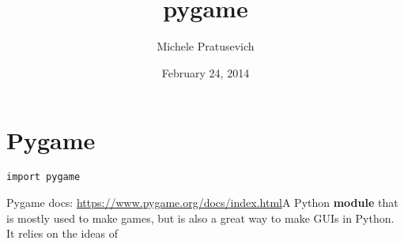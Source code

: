 \documentclass[letterpaper,10pt,english]{/usr/local/lib/python2.7/dist-packages/sphinx/texinputs/sphinxhowto}
\title{pygame}
\date{February 24, 2014}
\author{Michele Pratusevich}
\begin{document}
        
            \maketitle
        

        


        
        \section{Pygame}\begin{verbatim}
import pygame
\end{verbatim}
Pygame docs:
\href{https://www.pygame.org/docs/index.html}{https://www.pygame.org/docs/index.html}A Python \textbf{module} that is mostly used to make games, but is also
a great way to make GUIs in Python. It relies on the ideas of
\end{document}
